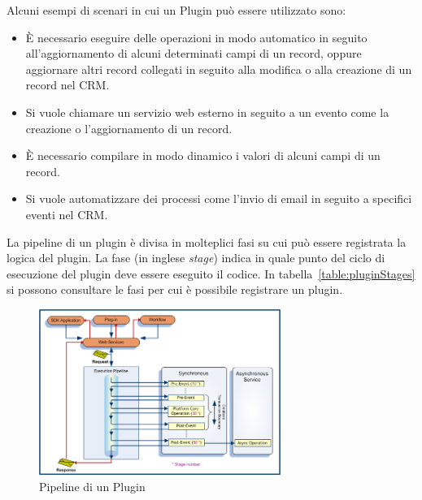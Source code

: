 Alcuni esempi di scenari in cui un Plugin può essere utilizzato sono:
\begin{itemize}
  \item È necessario eseguire delle operazioni in modo automatico in seguito all'aggiornamento di alcuni determinati campi di un record, oppure aggiornare altri record collegati in seguito alla modifica o alla creazione di un record nel CRM.
  \item Si vuole chiamare un servizio web esterno in seguito a un evento come la creazione o l'aggiornamento di un record.
  \item È necessario compilare in modo dinamico i valori di alcuni campi di un record.
  \item Si vuole automatizzare dei processi come l'invio di email in seguito a specifici eventi nel CRM.
\end{itemize}

La pipeline di un plugin è divisa in molteplici fasi su cui può essere registrata la logica del plugin. La fase (in inglese \textit{stage}) indica in quale punto del ciclo di esecuzione del plugin deve essere eseguito il codice. In tabella~\ref{table:pluginStages} si possono consultare le fasi per cui è possibile registrare un plugin.  

\begin{figure}[ht]
  \centering
  \includegraphics[width=0.7\textwidth]{plugin-pipeline.png}
  \caption{Pipeline di un Plugin}
  \label{fig:pluginPipeline}
\end{figure}

